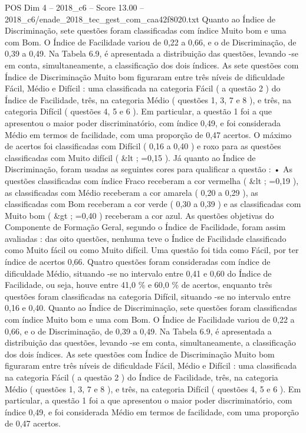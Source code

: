 \begin{textsample}{POS Dim 4 – 2018\_c6 – Score 13.00 – 2018\_c6/enade\_2018\_tec\_gest\_com\_caa42f8020.txt}
Quanto ao Índice de Discriminação, sete questões foram classificadas com índice Muito bom e uma com Bom.
O Índice de Facilidade variou de 0,22 a 0,66, e o de Discriminação, de 0,39 a 0,49.
Na Tabela 6.9, é apresentada a distribuição das questões, levando -se em conta, simultaneamente, a classificação dos dois índices.
As sete questões com Índice de Discriminação Muito bom figuraram entre três níveis de dificuldade Fácil, Médio e Difícil : uma classificada na categoria Fácil ( a questão 2 ) do Índice de Facilidade, três, na categoria Médio ( questões 1, 3, 7 e 8 ), e três, na categoria Difícil ( questões 4, 5 e 6 ).
Em particular, a questão 1 foi a que apresentou o maior poder discriminatório, com índice 0,49, e foi considerada Médio em termos de facilidade, com uma proporção de 0,47 acertos.
O máximo de acertos foi classificadas com Difícil ( 0,16 a 0,40 ) e roxo para as questões classificadas com Muito difícil ( \&lt ; =0,15 ).
Já quanto ao Índice de Discriminação, foram usadas as seguintes cores para qualificar a questão : • As questões classificadas com índice Fraco receberam a cor vermelha ( \&lt ; =0,19 ), as classificadas com Médio receberam a cor amarela ( 0,20 a 0,29 ), as classificadas com Bom receberam a cor verde ( 0,30 a 0,39 ) e as classificadas com Muito bom ( \&gt ; =0,40 ) receberam a cor azul.
As questões objetivas do Componente de Formação Geral, segundo o Índice de Facilidade, foram assim avaliadas : das oito questões, nenhuma teve o Índice de Facilidade classificado como Muito fácil ou como Muito difícil.
Uma questão foi tida como Fácil, por ter índice de acertos 0,66.
Quatro questões foram consideradas com índice de dificuldade Médio, situando -se no intervalo entre 0,41 e 0,60 do Índice de Facilidade, ou seja, houve entre 41,0 \% e 60,0 \% de acertos, enquanto três questões foram classificadas na categoria Difícil, situando -se no intervalo entre 0,16 e 0,40.
Quanto ao Índice de Discriminação, sete questões foram classificadas com índice Muito bom e uma com Bom.
O Índice de Facilidade variou de 0,22 a 0,66, e o de Discriminação, de 0,39 a 0,49.
Na Tabela 6.9, é apresentada a distribuição das questões, levando -se em conta, simultaneamente, a classificação dos dois índices.
As sete questões com Índice de Discriminação Muito bom figuraram entre três níveis de dificuldade Fácil, Médio e Difícil : uma classificada na categoria Fácil ( a questão 2 ) do Índice de Facilidade, três, na categoria Médio ( questões 1, 3, 7 e 8 ), e três, na categoria Difícil ( questões 4, 5 e 6 ).
Em particular, a questão 1 foi a que apresentou o maior poder discriminatório, com índice 0,49, e foi considerada Médio em termos de facilidade, com uma proporção de 0,47 acertos.

\end{textsample}
